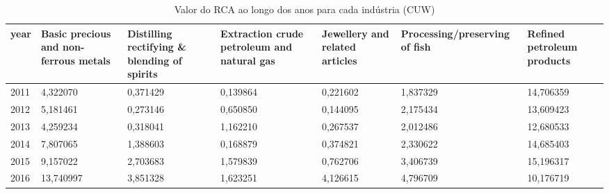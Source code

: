 \begin{table}
\centering
\caption{Valor do RCA ao longo dos anos para cada indústria (CUW)}
\begin{tabular}{p{1cm}p{2cm}p{2cm}p{2cm}p{2cm}p{2cm}p{2cm}}
\toprule
 year &  Basic precious and non-ferrous metals &  Distilling rectifying \& blending of spirits &  Extraction crude petroleum and natural gas &  Jewellery and related articles &  Processing/preserving of fish &  Refined petroleum products \\
\midrule
 2011 &                               4,322070 &                                     0,371429 &                                    0,139864 &                        0,221602 &                       1,837329 &                   14,706359 \\
 2012 &                               5,181461 &                                     0,273146 &                                    0,650850 &                        0,144095 &                       2,175434 &                   13,609423 \\
 2013 &                               4,259234 &                                     0,318041 &                                    1,162210 &                        0,267537 &                       2,012486 &                   12,680533 \\
 2014 &                               7,807065 &                                     1,388603 &                                    0,168879 &                        0,374821 &                       2,330622 &                   14,685403 \\
 2015 &                               9,157022 &                                     2,703683 &                                    1,579839 &                        0,762706 &                       3,406739 &                   15,196317 \\
 2016 &                              13,740997 &                                     3,851328 &                                    1,623251 &                        4,126615 &                       4,796709 &                   10,176719 \\
\bottomrule
\end{tabular}
\end{table}

